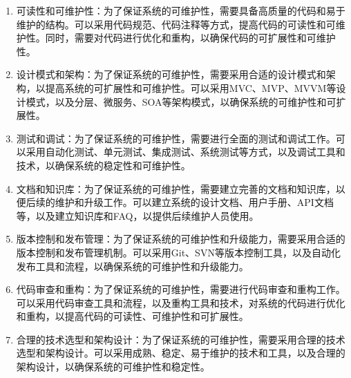 \documentclass[UTF8]{ctexart}
\newcommand{\m}[1]{\textcolor{modify}{#1}}
\begin{document}
    \m{
        \begin{enumerate}
            \item 可读性和可维护性：为了保证系统的可维护性，需要具备高质量的代码和易于维护的结构。可以采用代码规范、代码注释等方式，提高代码的可读性和可维护性。同时，需要对代码进行优化和重构，以确保代码的可扩展性和可维护性。
            \item 设计模式和架构：为了保证系统的可维护性，需要采用合适的设计模式和架构，以提高系统的可扩展性和可维护性。可以采用MVC、MVP、MVVM等设计模式，以及分层、微服务、SOA等架构模式，以确保系统的可维护性和可扩展性。
            \item 测试和调试：为了保证系统的可维护性，需要进行全面的测试和调试工作。可以采用自动化测试、单元测试、集成测试、系统测试等方式，以及调试工具和技术，以确保系统的稳定性和可维护性。
            \item 文档和知识库：为了保证系统的可维护性，需要建立完善的文档和知识库，以便后续的维护和升级工作。可以建立系统的设计文档、用户手册、API文档等，以及建立知识库和FAQ，以提供后续维护人员使用。
            \item 版本控制和发布管理：为了保证系统的可维护性和升级能力，需要采用合适的版本控制和发布管理机制。可以采用Git、SVN等版本控制工具，以及自动化发布工具和流程，以确保系统的可维护性和升级能力。
            \item 代码审查和重构：为了保证系统的可维护性，需要进行代码审查和重构工作。可以采用代码审查工具和流程，以及重构工具和技术，对系统的代码进行优化和重构，以提高代码的可读性、可维护性和可扩展性。
            \item 合理的技术选型和架构设计：为了保证系统的可维护性，需要采用合理的技术选型和架构设计。可以采用成熟、稳定、易于维护的技术和工具，以及合理的架构设计，以确保系统的可维护性和稳定性。
        \end{enumerate}
    }
    
\end{document}
